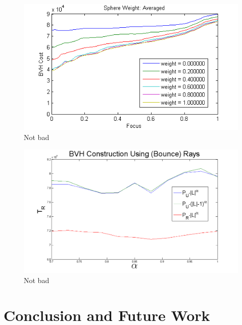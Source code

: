 \documentclass[twocolumn]{article}
\begin{document}
\begin{figure}
\caption{Not bad}
\includegraphics[scale=.6]{weight_average.png}
\end{figure}

\begin{figure}
\caption{Not bad}
\includegraphics[scale=.6]{powerplant.png}
\end{figure}

\section{Conclusion and Future Work}





\end{document}
